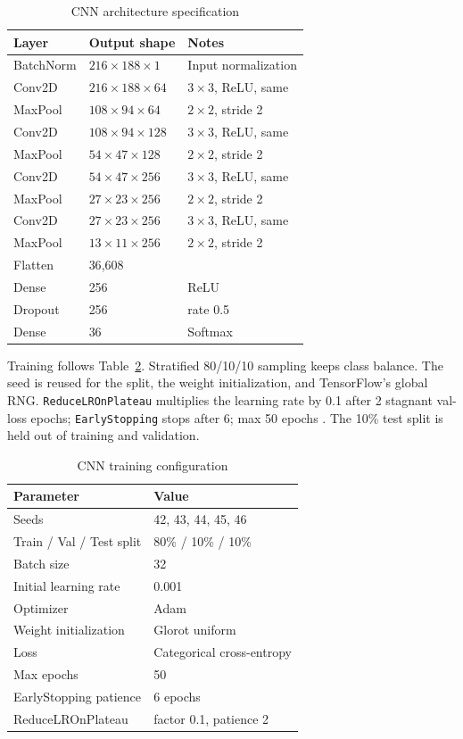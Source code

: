 \documentclass[pdflatex,sn-mathphys-num,iicol]{sn-jnl}
\theoremstyle{thmstyleone}
\theoremstyle{thmstyletwo}
\theoremstyle{thmstylethree}
\begin{document}
\begin{table}[t]
\caption{CNN architecture specification}\label{tab:cnn-architecture}
\begin{tabularx}{\columnwidth}{@{}lXl@{}}
\toprule
Layer & Output shape & Notes \\
\midrule
BatchNorm & $216{\times}188{\times}1$ & Input normalization \\
Conv2D & $216{\times}188{\times}64$ & $3{\times}3$, ReLU, same \\
MaxPool & $108{\times}94{\times}64$ & $2{\times}2$, stride 2 \\
Conv2D & $108{\times}94{\times}128$ & $3{\times}3$, ReLU, same \\
MaxPool & $54{\times}47{\times}128$ & $2{\times}2$, stride 2 \\
Conv2D & $54{\times}47{\times}256$ & $3{\times}3$, ReLU, same \\
MaxPool & $27{\times}23{\times}256$ & $2{\times}2$, stride 2 \\
Conv2D & $27{\times}23{\times}256$ & $3{\times}3$, ReLU, same \\
MaxPool & $13{\times}11{\times}256$ & $2{\times}2$, stride 2 \\
Flatten & 36{,}608 & \\
Dense & 256 & ReLU \\
Dropout & 256 & rate 0.5 \\
Dense & 36 & Softmax \\
\bottomrule
\end{tabularx}
\end{table}

Training follows Table~\ref{tab:cnn-training-config}. Stratified 80/10/10 sampling keeps class balance. The seed is reused for the split, the weight initialization, and TensorFlow's global RNG. \texttt{ReduceLROnPlateau} multiplies the learning rate by 0.1 after 2 stagnant val-loss epochs; \texttt{EarlyStopping} stops after 6; max 50 epochs \cite{Wolf-Monheim2025}. The 10\% test split is held out of training and validation.

\begin{table}[t]
\caption{CNN training configuration}\label{tab:cnn-training-config}
\begin{tabular}{@{}ll@{}}
\toprule
Parameter & Value \\
\midrule
Seeds & 42, 43, 44, 45, 46 \\
Train / Val / Test split & 80\% / 10\% / 10\% \\
Batch size & 32 \\
Initial learning rate & 0.001 \\
Optimizer & Adam \\
Weight initialization & Glorot uniform \\
Loss & Categorical cross-entropy \\
Max epochs & 50 \\
EarlyStopping patience & 6 epochs \\
ReduceLROnPlateau & factor 0.1, patience 2 \\
\bottomrule
\end{tabular}
\end{table}
\end{document}
